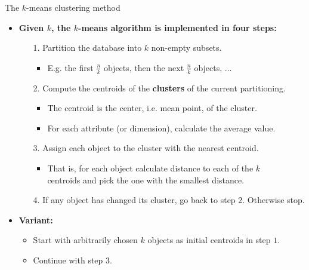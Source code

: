 \documentclass[aspectratio=169,t,xcolor=dvipsnames]{beamer}
\begin{document}
  {
    \begin{frame}{The $k$-means clustering method}
        \begin{itemize}
          \item \textbf{Given $k$, the $k$-means algorithm is implemented in four steps:}
          \begin{itemize}
            \item[1.] Partition the database into $k$ non-empty subsets.
            \begin{itemize}
              \item E.g. the first $\frac{n}{k}$ objects, then the next $\frac{n}{k}$ objects, $\ldots$
            \end{itemize}
            \item[2.] Compute the centroids of the \textbf{clusters} of the current partitioning.
            \begin{itemize}
              \item The centroid is the center, i.e. mean point, of the cluster.
              \item For each attribute (or dimension), calculate the average value.
            \end{itemize}
            \item[3.] Assign each object to the cluster with the nearest centroid.
            \begin{itemize}
              \item That is, for each object calculate distance to each of the $k$\\
              centroids and pick the one with the smallest distance.
            \end{itemize}
          \item[4.] If any object has changed its cluster, go back to step 2. Otherwise stop.
          \end{itemize}
          \item \textbf{Variant:}
          \begin{itemize}
            \item Start with arbitrarily chosen $k$ objects as initial centroids in step $1$.
            \item Continue with step $3$.
          \end{itemize}
        \end{itemize}
    \end{frame}
  }
\end{document}
